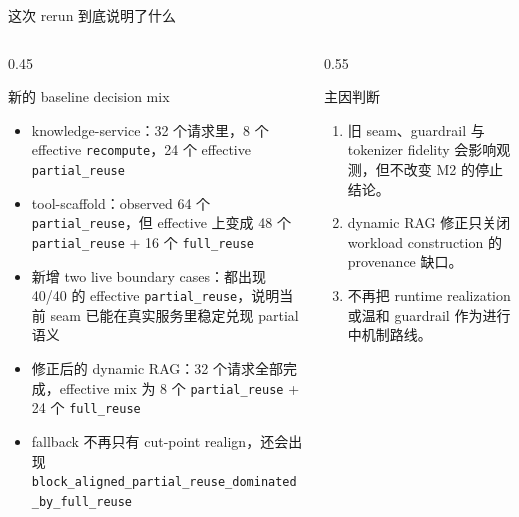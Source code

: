 \documentclass[aspectratio=169,UTF8,11pt]{ctexbeamer}
\begin{document}
\begin{frame}{这次 rerun 到底说明了什么}
  \begin{columns}[T]
    \begin{column}{0.45\textwidth}
      \begin{block}{新的 baseline decision mix}
        \begin{itemize}
          \item knowledge-service：32 个请求里，8 个 effective \texttt{recompute}，24 个 effective \texttt{partial\_reuse}
          \item tool-scaffold：observed 64 个 \texttt{partial\_reuse}，但 effective 上变成 48 个 \texttt{partial\_reuse} + 16 个 \texttt{full\_reuse}
          \item 新增 two live boundary cases：都出现 40/40 的 effective \texttt{partial\_reuse}，说明当前 seam 已能在真实服务里稳定兑现 partial 语义
          \item 修正后的 dynamic RAG：32 个请求全部完成，effective mix 为 8 个 \texttt{partial\_reuse} + 24 个 \texttt{full\_reuse}
          \item fallback 不再只有 cut-point realign，还会出现 \texttt{block\_aligned\_partial\_reuse\_dominated\_by\_full\_reuse}
        \end{itemize}
      \end{block}
    \end{column}
    \begin{column}{0.55\textwidth}
      \small
      \begin{alertblock}{主因判断}
        \begin{enumerate}
          \item 旧 seam、guardrail 与 tokenizer fidelity 会影响观测，但不改变 M2 的停止结论。
          \item dynamic RAG 修正只关闭 workload construction 的 provenance 缺口。
          \item 不再把 runtime realization 或温和 guardrail 作为进行中机制路线。
        \end{enumerate}
      \end{alertblock}
    \end{column}
  \end{columns}
\end{frame}
\end{document}
